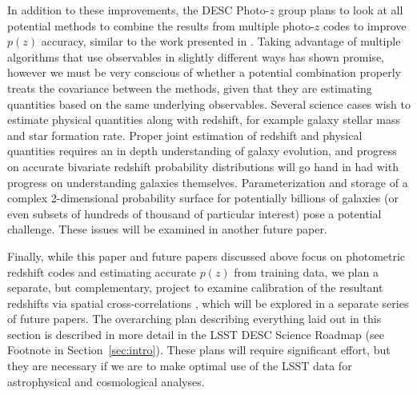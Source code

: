 \documentclass[usenatbib]{mn2e}
\newcommand{\red}[1]{\textcolor{red}{#1}}
\begin{document}
In addition to these improvements, the DESC Photo-$z$ group plans to look at all potential methods to combine the results from multiple photo-$z$ codes to improve $p(z)$ accuracy, similar to the work presented in \citet{Dahlen:13,Carrascokind:14,Duncan:18}.  Taking advantage of multiple algorithms that use observables in slightly different ways has shown promise, however we must be very conscious of whether a potential combination properly treats the covariance between the methods, given that they are estimating quantities based on the same underlying observables.  
Several science cases wish to estimate physical quantities along with redshift, for example galaxy stellar mass and star formation rate.  Proper joint estimation of redshift and physical quantities requires an in depth understanding of galaxy evolution, and progress on accurate bivariate redshift probability distributions will go hand in had with progress on understanding galaxies themselves.  Parameterization and storage of a complex 2-dimensional probability surface for potentially billions of galaxies (or even subsets of hundreds of thousand of particular interest) pose a potential challenge.  These issues will be examined in another future paper. 

Finally, while this paper and future papers discussed above focus on photometric redshift codes and estimating accurate $p(z)$ from training data, we plan a separate, but complementary, project to examine calibration of the resultant redshifts via spatial cross-correlations \citep{Newman:2008}, which will be explored in a separate series of future papers.  The overarching plan describing everything laid out in this section is described in more detail in the LSST DESC Science Roadmap (see Footnote in Section~\ref{sec:intro}).  These plans will require significant effort, but they are necessary if we are to make optimal use of the LSST data for astrophysical and cosmological analyses.   

\end{document}
